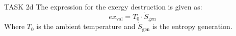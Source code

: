 TASK 2d  
The expression for the exergy destruction is given as:  
\[
ex_{\text{val}} = T_0 \cdot \dot{S}_{\text{gen}}
\]  
Where \( T_0 \) is the ambient temperature and \( \dot{S}_{\text{gen}} \) is the entropy generation.
